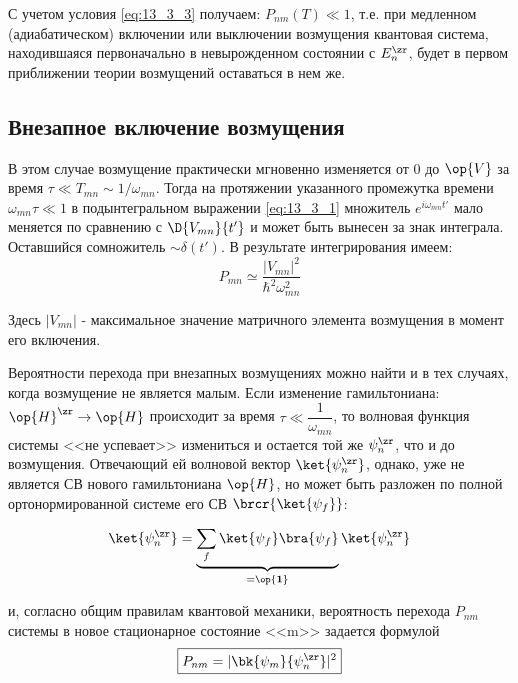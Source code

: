 С учетом условия \eqref{eq:13_3_3} получаем: $\boxed{P_{nm}(T) \ll 1}$, т.е. при медленном (адиабатическом) включении или выключении возмущения квантовая система, находившаяся первоначально в невырожденном состоянии с $E_n^\zr$, будет в первом приближении теории возмущений оставаться в нем же.

\subsection{Внезапное включение возмущения}

В этом случае возмущение практически мгновенно изменяется от 0 до $\op{V}$ за время $\tau \ll T_{mn} \sim 1/\omega_{mn}$. Тогда на протяжении указанного промежутка времени $\omega_{mn} \tau \ll 1$ в подынтегральном выражении \eqref{eq:13_3_1} множитель $e^{i\omega_{mn} t'}$ мало меняется по сравнению с $\D{V_{mn}}{t'}$ и может быть вынесен за знак интеграла. Оставшийся сомножитель $\sim \delta(t')$. В результате интегрирования имеем:
\begin{equation}
\label{eq:13_3_4}
\boxed{P_{mn} \simeq \frac{|V_{mn}|^2}{\hbar^2 \omega_{mn}^2}}
\end{equation}

Здесь $|V_{mn}|$ - максимальное значение матричного элемента возмущения в момент его включения.

Вероятности перехода при внезапных возмущениях можно найти и в тех случаях, когда возмущение не является малым. Если изменение гамильтониана: $\op{H}^\zr \to \op{H}$ происходит за время $\tau \ll \dfrac{1}{\omega_{mn}}$, то волновая функция системы <<не успевает>> измениться и остается той же $\psi_n^\zr$, что и до возмущения. Отвечающий ей волновой вектор $\ket{\psi_n^\zr}$, однако, уже не является СВ нового гамильтониана $\op{H}$, но может быть разложен по полной ортонормированной системе его СВ $\brcr{\ket{\psi_f}}$:

$$
\ket{\psi_n^\zr} = \underbrace{\sum_f \ket{\psi_f} \bra{\psi_f}}_{=\op{\mathbf{1}}}\ket{\psi_n^\zr}
$$

и, согласно общим правилам квантовой механики, вероятность перехода $P_{nm}$ системы в новое стационарное состояние <<m>> задается формулой
\begin{equation}
\label{eq:13_3_5}
\boxed{P_{nm} = |\bk{\psi_m}{\psi_n^\zr}|^2}
\end{equation}

